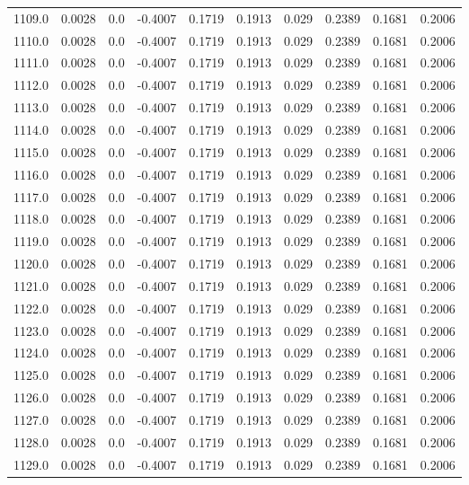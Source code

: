 \begin{longtable}{lrrrrrrrrr}
1109.0 & 0.0028 & 0.0 & -0.4007 & 0.1719 & 0.1913 & 0.029 & 0.2389 & 0.1681 & 0.2006 \\
1110.0 & 0.0028 & 0.0 & -0.4007 & 0.1719 & 0.1913 & 0.029 & 0.2389 & 0.1681 & 0.2006 \\
1111.0 & 0.0028 & 0.0 & -0.4007 & 0.1719 & 0.1913 & 0.029 & 0.2389 & 0.1681 & 0.2006 \\
1112.0 & 0.0028 & 0.0 & -0.4007 & 0.1719 & 0.1913 & 0.029 & 0.2389 & 0.1681 & 0.2006 \\
1113.0 & 0.0028 & 0.0 & -0.4007 & 0.1719 & 0.1913 & 0.029 & 0.2389 & 0.1681 & 0.2006 \\
1114.0 & 0.0028 & 0.0 & -0.4007 & 0.1719 & 0.1913 & 0.029 & 0.2389 & 0.1681 & 0.2006 \\
1115.0 & 0.0028 & 0.0 & -0.4007 & 0.1719 & 0.1913 & 0.029 & 0.2389 & 0.1681 & 0.2006 \\
1116.0 & 0.0028 & 0.0 & -0.4007 & 0.1719 & 0.1913 & 0.029 & 0.2389 & 0.1681 & 0.2006 \\
1117.0 & 0.0028 & 0.0 & -0.4007 & 0.1719 & 0.1913 & 0.029 & 0.2389 & 0.1681 & 0.2006 \\
1118.0 & 0.0028 & 0.0 & -0.4007 & 0.1719 & 0.1913 & 0.029 & 0.2389 & 0.1681 & 0.2006 \\
1119.0 & 0.0028 & 0.0 & -0.4007 & 0.1719 & 0.1913 & 0.029 & 0.2389 & 0.1681 & 0.2006 \\
1120.0 & 0.0028 & 0.0 & -0.4007 & 0.1719 & 0.1913 & 0.029 & 0.2389 & 0.1681 & 0.2006 \\
1121.0 & 0.0028 & 0.0 & -0.4007 & 0.1719 & 0.1913 & 0.029 & 0.2389 & 0.1681 & 0.2006 \\
1122.0 & 0.0028 & 0.0 & -0.4007 & 0.1719 & 0.1913 & 0.029 & 0.2389 & 0.1681 & 0.2006 \\
1123.0 & 0.0028 & 0.0 & -0.4007 & 0.1719 & 0.1913 & 0.029 & 0.2389 & 0.1681 & 0.2006 \\
1124.0 & 0.0028 & 0.0 & -0.4007 & 0.1719 & 0.1913 & 0.029 & 0.2389 & 0.1681 & 0.2006 \\
1125.0 & 0.0028 & 0.0 & -0.4007 & 0.1719 & 0.1913 & 0.029 & 0.2389 & 0.1681 & 0.2006 \\
1126.0 & 0.0028 & 0.0 & -0.4007 & 0.1719 & 0.1913 & 0.029 & 0.2389 & 0.1681 & 0.2006 \\
1127.0 & 0.0028 & 0.0 & -0.4007 & 0.1719 & 0.1913 & 0.029 & 0.2389 & 0.1681 & 0.2006 \\
1128.0 & 0.0028 & 0.0 & -0.4007 & 0.1719 & 0.1913 & 0.029 & 0.2389 & 0.1681 & 0.2006 \\
1129.0 & 0.0028 & 0.0 & -0.4007 & 0.1719 & 0.1913 & 0.029 & 0.2389 & 0.1681 & 0.2006 \\

\end{longtable}
